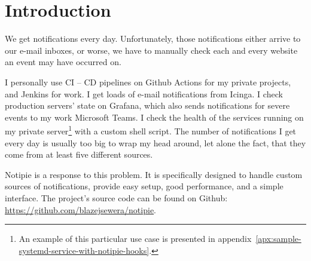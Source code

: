 \section{Introduction}\label{sec:introduction}

We get notifications every day.
Unfortunately,
those notifications either arrive
to our e-mail inboxes,
or worse,
we have to manually check
each and every website an event may have occurred on.

I personally use \ac{CI} -- \ac{CD} pipelines
on Github Actions for my private projects,
and Jenkins for work.
I get loads of e-mail notifications from Icinga.
I check production servers' state on Grafana,
which also sends notifications
for severe events to my work Microsoft Teams.
I check the health of the services
running on my private server\footnote{
  An example of this particular use case
  is presented in appendix~\ref{apx:sample-systemd-service-with-notipie-hooks}.
} with a custom shell script.
The number of notifications I get every day
is usually too big to wrap my head around,
let alone the fact,
that they come from at least five different sources.

Notipie is a response to this problem.
It is specifically designed
to handle custom sources of notifications,
provide easy setup,
good performance,
and a simple interface.
The project's source code can be found
on Github: \url{https://github.com/blazejsewera/notipie}.


